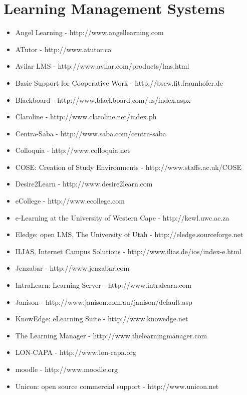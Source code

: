 \documentclass[12pt,a4paper,final,twoside,onecolumn,titlepage]{book}
\begin{document}
\section{Learning Management Systems}
\begin{itemize}
\item Angel Learning - http://www.angellearning.com
\item ATutor - http://www.atutor.ca
\item Avilar \gls{LMS} - http://www.avilar.com/products/lms.html
\item Basic Support for Cooperative Work - http://bscw.fit.fraunhofer.de
\item Blackboard - http://www.blackboard.com/us/index.aspx
\item Claroline - http://www.claroline.net/index.ph
\item Centra-Saba - http://www.saba.com/centra-saba
\item Colloquia - http://www.colloquia.net
\item COSE: Creation of Study Environments - http://www.staffs.ac.uk/COSE
\item Desire2Learn - http://www.desire2learn.com
\item eCollege - http://www.ecollege.com
\item e-Learning at the University of Western Cape - http://kewl.uwc.ac.za
\item Eledge: open \gls{LMS}, The University of Utah - http://eledge.sourceforge.net
\item ILIAS, Internet Campus Solutions - http://www.ilias.de/ios/index-e.html
\item  Jenzabar - http://www.jenzabar.com
\item IntraLearn: Learning Server - http://www.intralearn.com
\item  Janison - http://www.janison.com.au/janison/default.asp
\item KnowEdge: eLearning Suite - http://www.knowedge.net
\item The Learning Manager - http://www.thelearningmanager.com
\item LON-CAPA - http://www.lon-capa.org
\item \gls{moodle} - http://www.moodle.org
\item Unicon: open source commercial support - http://www.unicon.net
\end{itemize}

\end{document}
